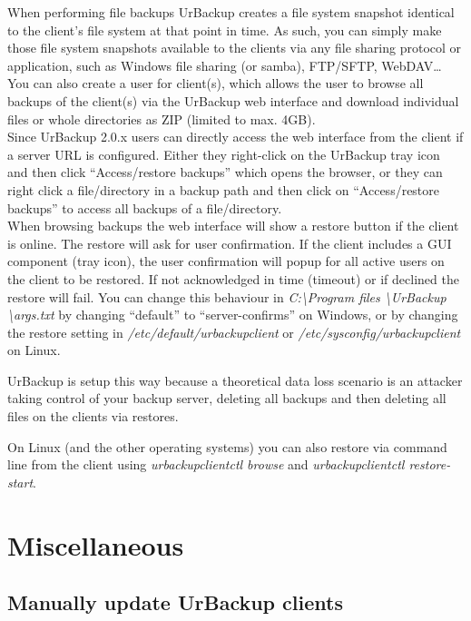 \documentclass[a4paper,10pt]{article}
\begin{document}
When performing file backups UrBackup creates a file system snapshot identical to the client's file system at that point in time. As such, you can simply make those file system snapshots available to the clients via any file sharing protocol or application, such as Windows file sharing (or samba), FTP/SFTP, WebDAV\ldots\\

You can also create a user for client(s), which allows the user to browse all backups of the client(s) via the UrBackup web interface and download individual files or whole directories as ZIP (limited to max. 4GB).\\

Since UrBackup 2.0.x users can directly access the web interface from the client if a server URL is configured. Either they right-click on the UrBackup tray icon and then click ``Access/restore backups'' which opens the browser, or they can right click a file/directory in a backup path and then click on ``Access/restore backups'' to access all backups of a file/directory.\\

When browsing backups the web interface will show a restore button if the client is online. The restore will ask for user confirmation. If the client includes a GUI component (tray icon), the user confirmation will popup for all active users on the client to be restored. If not acknowledged in time (timeout) or if declined the restore will fail. 
You can change this behaviour in \textsl{C:\textbackslash Program files \textbackslash UrBackup \textbackslash args.txt} by changing ``default'' to ``server-confirms'' on Windows, or by changing the restore setting in \textsl{/etc/default/urbackupclient} or \textsl{/etc/sysconfig/urbackupclient} on Linux.

UrBackup is setup this way because a theoretical data loss scenario is an attacker taking control of your backup server, deleting all backups and then deleting all files on the clients via restores.  

On Linux (and the other operating systems) you can also restore via command line from the client using \textsl{urbackupclientctl browse} and \textsl{urbackupclientctl restore-start}.

\section{Miscellaneous}

\subsection{Manually update UrBackup clients}
\label{subsec:manually_update_client}
\end{document}
